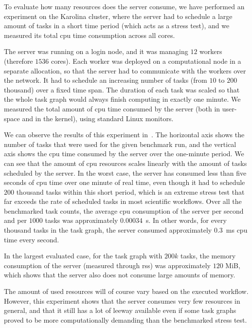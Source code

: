 To evaluate how many resources does the server consume, we have performed an experiment on the
Karolina cluster, where the server had to schedule a large amount of tasks in a short time period
(which acts as a stress test), and we measured its total \gls{cpu} time consumption
across all cores.

The server was running on a login node, and it was managing $12$ workers
(therefore $1536$ cores). Each worker was deployed on a computational node in a
separate allocation, so that the server had to communicate with the workers over the network. It
had to schedule an increasing number of tasks (from $10$ to
$200$ thousand) over a fixed time span. The duration of each task was scaled so
that the whole task graph would always finish computing in exactly one minute. We measured the
total amount of \gls{cpu} time consumed by the server (both in user-space and in the
kernel), using standard Linux monitors.

We can observe the results of this experiment in~. The horizontal axis shows
the number of tasks that were used for the given benchmark run, and the vertical axis shows the
\gls{cpu} time consumed by the server over the one-minute period. We can see that the
amount of \gls{cpu} resources scales linearly with the amount of tasks scheduled by
the server. In the worst case, the server has consumed less than five seconds of
\gls{cpu} time over one minute of real time, even though it had to schedule
$200$ thousand tasks within this short period, which is an extreme stress test
that far exceeds the rate of scheduled tasks in most scientific workflows. Over all the benchmarked
task counts, the average \gls{cpu} consumption of the server per second and per
$1000$ tasks was approximately $0.00034$~s. In other words, for every
thousand tasks in the task graph, the server consumed approximately $0.3$~ms
\gls{cpu} time every second.

In the largest evaluated case, for the task graph with $200k$ tasks, the memory
consumption of the server (measured through \gls{rss}) was approximately
$120$ MiB, which shows that the server also does not consume large amounts of
memory.

The amount of used resources will of course vary based on the executed workflow. However, this
experiment shows that the server consumes very few resources in general, and that it still has a
lot of leeway available even if some task graphs proved to be more computationally demanding than
the benchmarked stress test.

